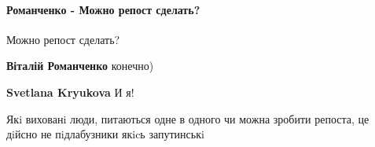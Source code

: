  
 
 
 
 
\paragraph{Романченко - Можно репост сделать?}

\begin{itemize}
 
Можно репост сделать?

\begin{itemize}

 
\textbf{Віталій Романченко} конечно)

 
\textbf{Svetlana Kryukova} И я!

 
Якi вихованi люди, питаються одне в одного чи можна зробити репоста, це дiйсно не пiдлабузники якicь запутинськi

 

\end{itemize}
\end{itemize}

